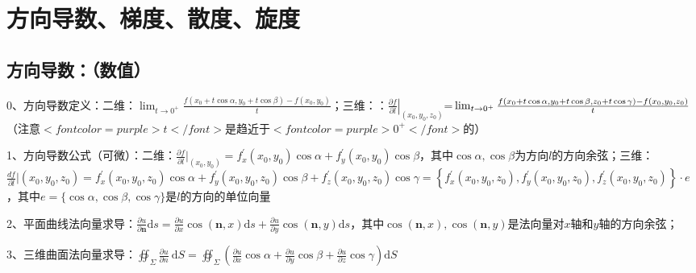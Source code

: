 \section{方向导数、梯度、散度、旋度}



\subsection{方向导数：（数值）}

0、方向导数定义：二维：$ \lim _{t \rightarrow 0^{+}} \frac{f\left(x_{0}+t \cos \alpha, y_{0}+t \cos \beta\right)-f\left(x_{0}, y_{0}\right)}{t} $；三维：：$ \left.\frac{\partial f}{\partial l}\right|_{\left(x_{0}, y_{0}, z_{0}\right)} $=$ \newline\lim _{t \rightarrow 0^{+}} \frac{f\left(x_{0}+t \cos \alpha, y_{0}+t \cos \beta, z_{0}+t \cos \gamma\right)-f\left(x_{0}, y_{0}, z_{0}\right)}{t} $（注意$ <font color=purple>t</font> $是趋近于$ <font color=purple>0^+</font> $的）

1、方向导数公式（可微）：二维：$ \frac{\partial f}{\partial l}|_{\left(x_{0}, y_{0}\right)}= f_{x}^{\prime}(x_{0},y_{0}) \cos \alpha+f_{y}^{\prime}\left(x_{0}, y_{0}\right) \cos \beta $，其中$ \cos \alpha, \cos \beta $为方向$ l $的方向余弦；三维：$ \frac{d f}{\partial l}|{\left(x_{0}, y_{0}, z_{0}\right)} =f_{x}^{\prime}\left(x_{0}, y_{0}, z_{0}\right) \cos \alpha+f_{y}^{\prime}\left(x_{0}, y_{0}, z_{0}\right) \cos \beta+f_{z}^{\prime}\left(x_{0}, y_{0}, z_{0}\right) \cos \gamma =\left\{f_{x}^{\prime}\left(x_{0}, y_{0}, z_{0}\right), f_{y}^{\prime}\left(x_{0}, y_{0}, z_{0}\right), f_{z}^{\prime}\left(x_{0}, y_{0}, z_{0}\right)\right\} \cdot e $，其中$ e=\{\cos \alpha, \cos \beta, \cos \gamma\} $是$ l $的方向的单位向量

2、平面曲线法向量求导：$ \frac{\partial u}{\partial \boldsymbol{n}} \mathrm{d} s=\frac{\partial u}{\partial x} \cos (\boldsymbol{n}, x) \mathrm{d} s+\frac{\partial u}{\partial y} \cos (\boldsymbol{n}, y) \mathrm{d} s $，其中$ \cos (\boldsymbol{n}, x) ,\cos (\boldsymbol{n}, y) $是法向量对$ x $轴和$ y $轴的方向余弦；

3、三维曲面法向量求导：$ \oiint_{\Sigma} \frac{\partial u}{\partial n} \mathrm{~d} S=\oiint_{\Sigma}\left(\frac{\partial u}{\partial x} \cos \alpha+\frac{\partial u}{\partial y} \cos \beta+\frac{\partial u}{\partial z} \cos \gamma\right) \mathrm{d} S $



